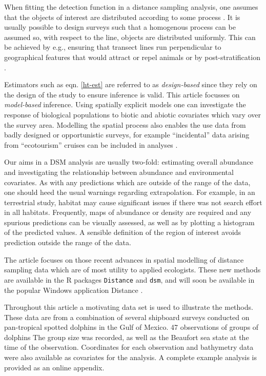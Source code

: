 \documentclass[a4paper,12pt]{article}
\begin{document}
When fitting the detection function in a distance sampling analysis, one assumes that the objects of interest are distributed according to some process \citep[Section 2.1]{Buckland:2001vm}. It is usually possible to design surveys such that a homogenous process can be assumed so, with respect to the line, objects are distributed uniformly. This can be achieved by e.g., ensuring that transect lines run perpendicular to geographical features that would attract or repel animals or by post-stratification \citep[Section 3.7]{Buckland:2001vm}. 

Estimators such as eqn. \ref{ht-est} are referred to as \textit{design-based} since they rely on the design of the study to ensure inference is valid. This article focusses on \textit{model-based} inference. Using spatially explicit models one can investigate the response of biological populations to biotic and abiotic covariates which vary over the survey area. Modelling the spatial process also enables the use data from badly designed or opportunistic surveys, for example ``incidental'' data arising from ``ecotourism'' cruises can be included in analyses \citep{Williams:2006tz}. 

Our aims in a DSM analysis are usually two-fold: estimating overall abundance and investigating the relationship between abundance and environmental covariates. As with any predictions which are outside of the range of the data, one should heed the usual warnings regarding extrapolation. For example, in an terrestrial study, habitat may cause significant issues if there was not search effort in all habitats. Frequently,  maps of abundance or density are required and any spurious predictions can be visually assessed, as well as by plotting a histogram of the predicted values. A sensible definition of the region of interest avoids prediction outside the range of the data.

The article focuses on those recent advances in spatial modelling of distance sampling data which are of most utility to applied ecologists. These new methods are available in the \textsf{R} packages \texttt{Distance} and \texttt{dsm}, and will soon be available in the popular Windows application Distance \citep{Thomas:2010cf}.

Throughout this article a motivating data set is used to illustrate the methods. These data are from a combination of several shipboard surveys conducted on pan-tropical spotted dolphins in the Gulf of Mexico. 47 observations of groups of dolphins The group size was recorded, as well as the Beaufort sea state at the time of the observation. Coordinates for each observation and bathymetry data were also available as covariates for the analysis. A complete example analysis is provided as an online appendix.
\end{document}

